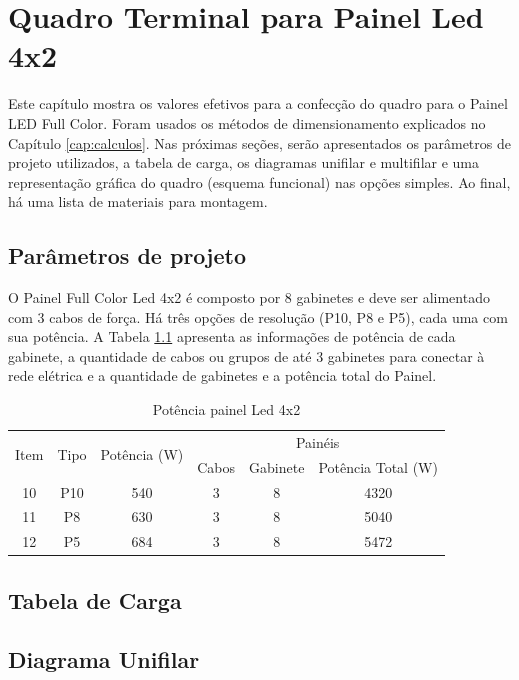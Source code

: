 \chapter{Quadro Terminal para Painel Led 4x2}

Este capítulo mostra os valores efetivos para a confecção do quadro para o Painel LED Full Color. Foram usados os métodos de dimensionamento explicados no Capítulo \ref{cap:calculos}. Nas próximas seções, serão apresentados os parâmetros de projeto utilizados, a tabela de carga, os diagramas unifilar e multifilar e uma representação gráfica do quadro (esquema funcional) nas opções simples. Ao final, há uma lista de materiais para montagem.

\section{Parâmetros de projeto}

O Painel Full Color Led 4x2 é composto por 8 gabinetes e deve ser alimentado com 3 cabos de força. Há três opções de resolução (P10, P8 e P5), cada uma com sua potência. A Tabela \ref{tab:pot_4x2} apresenta as informações de potência de cada gabinete, a quantidade de cabos ou grupos de até 3 gabinetes para conectar à rede elétrica e a quantidade de gabinetes e a potência total do Painel.

\begin{table}[htbp]
\caption{Potência painel Led 4x2}
\centering
\begin{tabular}{cccccc}
\toprule
\multirow{2}{*}{Item} & \multirow{2}{*}{Tipo} & \multirow{2}{*}{Potência (W)} & \multicolumn{3}{c}{Painéis} \\
\cmidrule{4-6}
& & & Cabos  & Gabinete & Potência Total (W) \\
\midrule


10 & P10 & 540 & 3 & 8 & 4320 \\
11 & P8 & 630 & 3 & 8 & 5040 \\
12 & P5 & 684 & 3 & 8 & 5472 \\


\bottomrule
\end{tabular}
\label{tab:pot_4x2}
\end{table}



\section{Tabela de Carga}
\section{Diagrama Unifilar}
